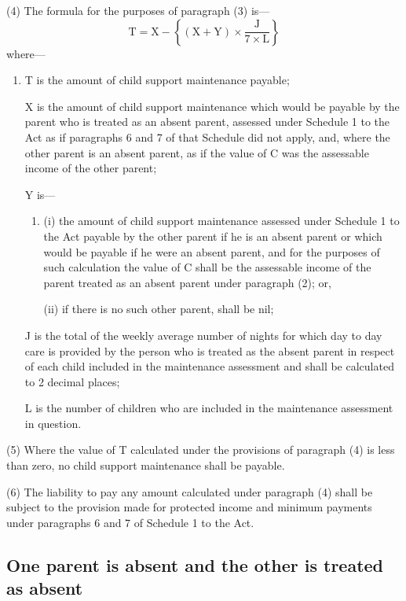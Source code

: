 \documentclass[12pt,a4paper]{article}
\begin{document}
(4) The formula for the purposes of paragraph (3) is—
\[\mathrm{T} = \mathrm{X} - \left\{ (\mathrm{X}+\mathrm{Y}) \times \frac{\mathrm{J}}{7 \times \mathrm{L}} \right\}\]
where—
\begin{enumerate}\item[]
    T is the amount of child support maintenance payable;

    X is the amount of child support maintenance which would be payable by the parent who is treated as an absent parent, assessed under Schedule 1 to the Act as if paragraphs 6 and 7 of that Schedule did not apply, and, where the other parent is an absent parent, as if the value of C was the assessable income of the other parent;

    Y is—
\begin{enumerate}\item[]
    (i)
    the amount of child support maintenance assessed under Schedule 1 to the Act payable by the other parent if he is an absent parent or which would be payable if he were an absent parent, and for the purposes of such calculation the value of C shall be the assessable income of the parent treated as an absent parent under paragraph (2); or,

    (ii)
    if there is no such other parent, shall be nil;
\end{enumerate}

    J is the total of the weekly average number of nights for which day to day care is provided by the person who is treated as the absent parent in respect of each child included in the maintenance assessment and shall be calculated to 2 decimal places;

    L is the number of children who are included in the maintenance assessment in question. 
\end{enumerate}

(5) Where the value of T calculated under the provisions of paragraph (4) is less than zero, no child support maintenance shall be payable.

(6) The liability to pay any amount calculated under paragraph (4) shall be subject to the provision made for protected income and minimum payments under paragraphs 6 and 7 of Schedule 1 to the Act.

\subsection[21. One parent is absent and the other is treated as absent]{One parent is absent and the other is treated as absent}
\end{document}
